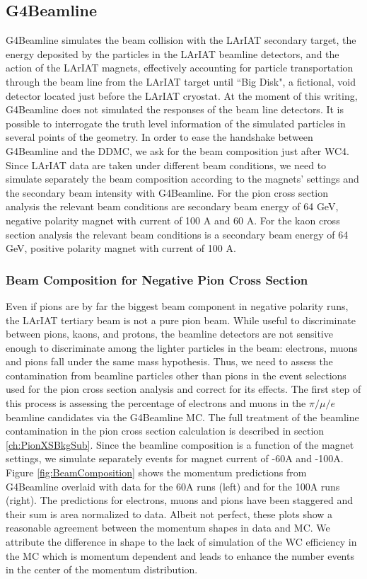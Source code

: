 \subsection{G4Beamline}\label{ch:beamlineComposition}
G4Beamline simulates the beam collision with the LArIAT secondary target, the energy deposited by the particles in the LArIAT beamline detectors, and the action of the LArIAT magnets, effectively accounting for particle transportation through the beam line from the LArIAT target until ``Big Disk", a fictional, void detector located just before the LArIAT cryostat. 
 At the moment of this writing, G4Beamline does not simulated the responses of the beam line detectors. It is possible to interrogate the truth level information of the simulated particles in several points of the geometry. In order to ease the handshake between G4Beamline and the DDMC, we ask for the beam composition just after WC4.
Since LArIAT data are taken under different beam conditions, we need to simulate separately the beam composition according to the magnets' settings and the secondary beam intensity with G4Beamline. For the pion cross section analysis the relevant beam conditions are  secondary beam energy of 64 GeV, negative polarity magnet with current of 100 A and 60 A. For the kaon cross section analysis the relevant beam conditions is a secondary beam energy of 64 GeV, positive polarity magnet with current of 100 A. 

\subsubsection{Beam Composition for Negative Pion Cross Section}
Even if pions are by far the biggest beam component in negative polarity runs, the LArIAT tertiary beam is not a pure pion beam. While useful to discriminate between pions, kaons, and protons, the beamline detectors are not sensitive enough to  discriminate among the lighter particles in the beam: electrons, muons and pions fall under the same mass hypothesis. Thus, we need to assess the contamination from beamline particles other than pions in the event selections used for the pion cross section analysis and correct for its effects. The first step of this process is assessing the percentage of electrons and muons in the $\pi/\mu/e$ beamline candidates via the G4Beamline MC. The full treatment of the beamline contamination in the pion cross section calculation is described in section \ref{ch:PionXSBkgSub}.
Since the beamline composition is a function of the magnet settings, we simulate separately events for magnet current of -60A and -100A. 
Figure \ref{fig:BeamComposition} shows the momentum predictions from G4Beamline overlaid with data for the 60A runs (left) and for the 100A runs (right). The predictions for electrons, muons and pions have been staggered and their sum is area normalized to data. Albeit not perfect, these plots show a reasonable agreement between the momentum shapes in data and MC. We attribute  the difference in shape to the lack of simulation of the WC efficiency in the MC which is momentum dependent and leads to enhance the number events in the center of the momentum distribution.

